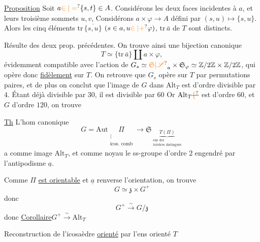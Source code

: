 \uline{Proposition} Soit $a\unsure{\in|=}\{s,t\}\in A$. Considérons  les deux faces incidentes à $a$, et  leurs troisième sommets $u,v$,   Considérons $a\times\varphi\longrightarrow A$ défini par $(s,u)\longmapsto\{s,u\}$. Alors les cinq éléments $\mathrm{tr}\,\overline{\{s,u\}}$ $(s\in a,u\unsure{\in|+}\varphi)$, $\mathrm{tr}\,\bar a$ de $T$ sont distincts.

Résulte des deux prop. précédentes.
On trouve ainsi une bijection canonique
\[
T\simeq\{\mathrm{tr}\,\bar a\}\amalg a\times\varphi,
\]
évidemment compatible avec l'action de $G_s\simeq\unsure{\mathfrak S|\mathscr S}_a\times\mathfrak S_\varphi\simeq\mathbb Z/2\mathbb Z\times\mathbb Z/2\mathbb Z$, qui opère donc \uline{fidèlement} sur $T$. On retrouve que $G_s$ opère sur $T$ par permutations paires, et  de plus on conclut que l'image de $G$ dans $\mathrm{Alt}_T$ est d'ordre divisible par $4$. Étant déjà  divisible par $30$, il est divisible par $60$ Or $\mathrm{Alt}_T\deleted{\unsure{\{}}$ est d'ordre $60$,  et  $G$ d'ordre $120$, on trouve

\uline{Th} L'hom canonique
\[
G=\mathrm{Aut}\underset{\substack{|\\\text{icos. comb}}}{\Pi}
 \longrightarrow\mathfrak S_{\underbrace{T(\Pi)}_{\substack{\text{ens des}\\\text{trièdres distingués}}}}
\]
a comme image $\mathrm{Alt}_T$, et comme noyau le ss-groupe  d'ordre $2$ engendré par l'antipodisme $\underline a$.

Comme  $\Pi$ \uline{est orientable} et $\underline a$ renverse  l'orientation, on trouve
\[
G\simeq \mathfrak z\times G^+
\]
donc
\[
G^+\xrightarrow{\sim}G/\mathfrak z
\]
donc
\uline{Corollaire}\qquad $G^+\xrightarrow{\sim}\mathrm{Alt}_T$

Reconstruction de l'icosaèdre \uline{orienté} par l'ens orienté $T$

